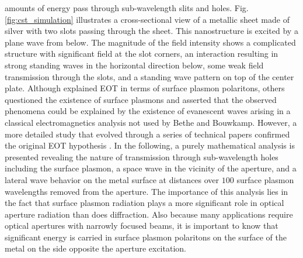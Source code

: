 \documentclass[11pt]{article}
\begin{document}
amounts of energy pass through sub-wavelength slits and holes. Fig. \ref{fig:cst_simulation} illustrates a cross-sectional view of a metallic sheet made of silver with two slots passing through the sheet. This nanostructure is excited by a plane wave from below. The magnitude of the field intensity shows a complicated structure with significant field at the slot corners, an interaction resulting in strong standing waves in the horizontal direction below, some weak field transmission through the slots, and a standing wave pattern on top of the center plate.
Although \cite{Ebbesen1998} explained EOT in terms of surface plasmon polaritons, others \cite{Lezec2004,Gay2006} questioned the existence of surface plasmons and asserted that the observed phenomena could be explained by the existence of evanescent waves arising in a classical electromagnetics analysis not used by Bethe and Bouwkamp. However, a more detailed study that evolved through a series of technical papers confirmed the original EOT hypothesis \cite{Lalanne2006,Nevels2014}. In the following, a purely mathematical analysis is presented revealing the nature of transmission through sub-wavelength holes including the surface plasmon, a space wave in the vicinity of the aperture, and a lateral wave behavior on the metal surface at distances over $100$ surface plasmon wavelengths removed from the aperture. The importance of this analysis lies in the fact that surface plasmon radiation plays a more significant role in optical aperture radiation than does diffraction. Also because many applications require optical apertures with narrowly focused beams, it is important to know that significant energy is carried in surface plasmon polaritons on the surface of the metal on the side opposite the aperture excitation.
\end{document}
